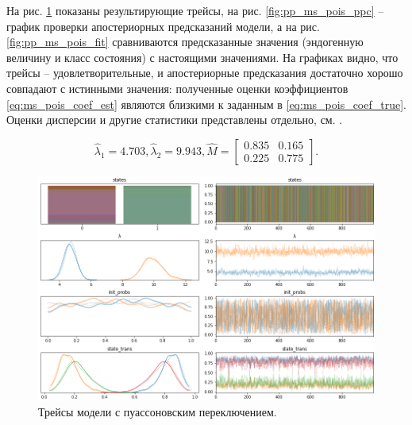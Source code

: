 \documentclass[a4paper,14pt]{extreport}
\begin{document}
На рис. \ref{fig:pp_ms_pois_trace} показаны результирующие трейсы, на рис.  \ref{fig:pp_ms_pois_ppc} -- график проверки апостериорных предсказаний модели, а на рис. \ref{fig:pp_ms_pois_fit} сравниваются предсказанные значения (эндогенную величину и класс состояния) с настоящими значениями. На графиках видно, что трейсы -- удовлетворительные, и апостериорные предсказания достаточно хорошо совпадают с истинными значения: полученные оценки коэффициентов \eqref{eq:ms_pois_coef_est} являются близкими к заданным в \eqref{eq:ms_pois_coef_true}. Оценки дисперсии и другие статистики представлены отдельно, см. .

\begin{equation}
	\hat{\lambda}_1 = 4.703, 
	\hat{\lambda}_2 = 9.943,
	\hat{M}= \left[ {\begin{array}{cc}
					0.835 & 0.165 \\
					0.225 & 0.775
				\end{array} } \right]
	.
	\label{eq:ms_pois_coef_est}
\end{equation}

\begin{figure}[H]
	\includegraphics[width=\linewidth]{img/gen/pp_ms_pois_trace.png}
	\caption{Трейсы модели с пуассоновским переключением. }
	\label{fig:pp_ms_pois_trace}
\end{figure}
\end{document}
